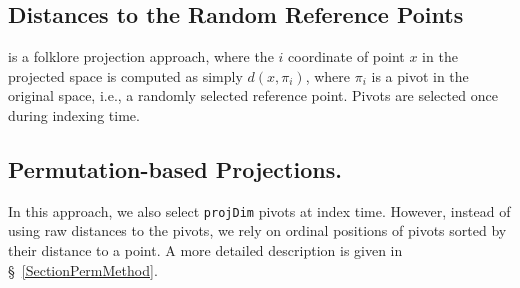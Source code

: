 \documentclass[runningheads,a4paper]{llncs}
\newcommand{\ttt}[1]{\texttt{#1}}
\begin{document}
\begin{appendix}
\subsection{Distances to the Random Reference Points} is a folklore projection approach,
where the $i$ coordinate of point $x$ in the projected space is computed as simply $d(x, \pi_i)$,
where $\pi_i$ is a pivot in the original space, i.e., a randomly selected reference point.
Pivots are selected once during indexing time.

\subsection{Permutation-based Projections.}
In this approach, we also select \ttt{projDim} pivots at index time.
However, instead of using raw distances to the pivots,
we rely on ordinal positions of pivots sorted by their distance to a point.  
A more detailed description is given in \S~\ref{SectionPermMethod}.
\end{appendix}
\end{document}
